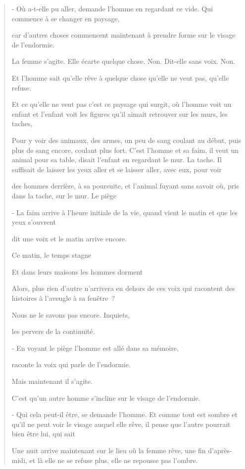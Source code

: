 \begin{quote}
- Où a-t-elle pu aller, demande l'homme en regardant ce vide. Qui
commence à se changer en paysage,

car d'autres choses commencent maintenant à prendre forme sur le visage
de l'endormie.

La femme s'agite. Elle écarte quelque chose. Non. Dit-elle sans voix.
Non.

Et l'homme sait qu'elle rêve à quelque chose qu'elle ne veut pas,
qu'elle refuse.

Et ce qu'elle ne veut pas c'est ce paysage qui surgit, où l'homme voit
un enfant et l'enfant voit les figures qu'il aimait retrouver sur les
murs, les taches,

Pour y voir des animaux, des armes, un peu de sang coulant au début,
puis plus de sang encore, coulant plus fort. C'est l'homme et sa faim,
il veut un animal pour sa table, disait l'enfant en regardant le mur. La
tache. Il suffisait de laisser les yeux aller et se laisser aller, avec
eux, pour voir

des hommes derrière, à sa poursuite, et l'animal fuyant sans savoir où,
pris dans la tache, sur le mur. Le piège

- La faim arrive à l'heure initiale de la vie, quand vient le matin et
que les yeux s'ouvrent

dit une voix et le matin arrive encore.

Ce matin, le temps stagne

Et dans leurs maisons les hommes dorment

Alors, plus rien d'autre n'arrivera en dehors de ces voix qui racontent
des histoires à l'aveugle à sa fenêtre~?

Nous ne le savons pas encore. Inquiets,

les pervers de la continuité.

- En voyant le piège l'homme est allé dans sa mémoire,

raconte la voix qui parle de l'endormie.

Mais maintenant il s'agite.

C'est qu'un autre homme s'incline sur le visage de l'endormie.

- Qui cela peut-il être, se demande l'homme. Et comme tout est sombre et
qu'il ne peut voir le visage auquel elle rêve, il pense que l'autre
pourrait bien être lui, qui sait

Une nuit arrive maintenant sur le lieu où la femme rêve, une fin
d'après-midi, et là elle ne se refuse plus, elle ne repousse pas
l'ombre.


\end{quote}
